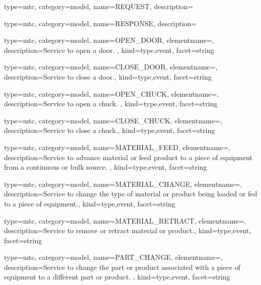 {
  type=mtc,
  category=model,
  name={REQUEST},
  description={}
}


{
  type=mtc,
  category=model,
  name={RESPONSE},
  description={}
}


{
  type=mtc,
  category=model,
  name={OPEN\_DOOR},
  elementname=,
  description={Service to open a door. },
  kind={type,event},
  facet={\gls{string}}
}


{
  type=mtc,
  category=model,
  name={CLOSE\_DOOR},
  elementname=,
  description={Service to close a door.},
  kind={type,event},
  facet={\gls{string}}
}


{
  type=mtc,
  category=model,
  name={OPEN\_CHUCK},
  elementname=,
  description={Service to open a chuck. },
  kind={type,event},
  facet={\gls{string}}
}


{
  type=mtc,
  category=model,
  name={CLOSE\_CHUCK},
  elementname=,
  description={Service to close a chuck.},
  kind={type,event},
  facet={\gls{string}}
}


{
  type=mtc,
  category=model,
  name={MATERIAL\_FEED},
  elementname=,
  description={Service to advance material or feed product to a piece of equipment from a continuous or bulk source. },
  kind={type,event},
  facet={\gls{string}}
}


{
  type=mtc,
  category=model,
  name={MATERIAL\_CHANGE},
  elementname=,
  description={Service to change the type of material or product being loaded or fed to a piece of equipment.},
  kind={type,event},
  facet={\gls{string}}
}


{
  type=mtc,
  category=model,
  name={MATERIAL\_RETRACT},
  elementname=,
  description={Service to remove or retract material or product.},
  kind={type,event},
  facet={\gls{string}}
}


{
  type=mtc,
  category=model,
  name={PART\_CHANGE},
  elementname=,
  description={Service to change the part or product associated with a piece of equipment to a different part or product.  },
  kind={type,event},
  facet={\gls{string}}
}


